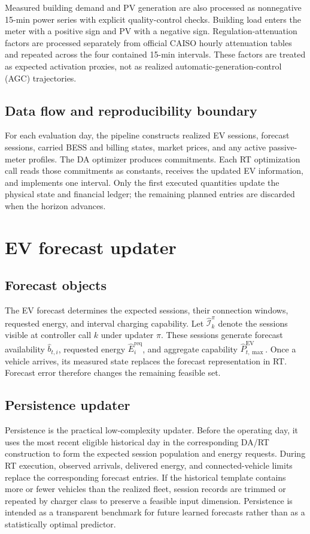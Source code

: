 \documentclass[final,5p,times]{elsarticle}
\newcommand{\EV}{\mathrm{EV}}
\newcommand{\req}{\mathrm{req}}
\begin{document}
Measured building demand and PV generation are also processed as nonnegative 15-min power series with explicit quality-control checks. Building load enters the meter with a positive sign and PV with a negative sign. Regulation-attenuation factors are processed separately from official CAISO hourly attenuation tables and repeated across the four contained 15-min intervals. These factors are treated as expected activation proxies, not as realized automatic-generation-control (AGC) trajectories.

\subsection{Data flow and reproducibility boundary}
For each evaluation day, the pipeline constructs realized EV sessions, forecast sessions, carried BESS and billing states, market prices, and any active passive-meter profiles. The DA optimizer produces commitments. Each RT optimization call reads those commitments as constants, receives the updated EV information, and implements one interval. Only the first executed quantities update the physical state and financial ledger; the remaining planned entries are discarded when the horizon advances.

\section{EV forecast updater}
\label{sec:forecasting}

\subsection{Forecast objects}
The EV forecast determines the expected sessions, their connection windows, requested energy, and interval charging capability. Let $\widehat{\mathcal I}_{k}^{\pi}$ denote the sessions visible at controller call $k$ under updater $\pi$. These sessions generate forecast availability $\widehat b_{t,i}$, requested energy $\widehat E_i^{\req}$, and aggregate capability $\widehat P_{t,\max}^{\EV}$. Once a vehicle arrives, its measured state replaces the forecast representation in RT. Forecast error therefore changes the remaining feasible set.

\subsection{Persistence updater}
Persistence is the practical low-complexity updater. Before the operating day, it uses the most recent eligible historical day in the corresponding DA/RT construction to form the expected session population and energy requests. During RT execution, observed arrivals, delivered energy, and connected-vehicle limits replace the corresponding forecast entries. If the historical template contains more or fewer vehicles than the realized fleet, session records are trimmed or repeated by charger class to preserve a feasible input dimension. Persistence is intended as a transparent benchmark for future learned forecasts rather than as a statistically optimal predictor.
\end{document}
